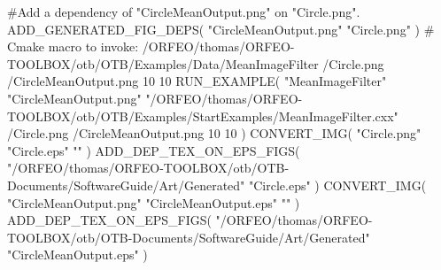 #Add a dependency of "CircleMeanOutput.png" on "Circle.png".
ADD_GENERATED_FIG_DEPS( "CircleMeanOutput.png" "Circle.png" )
# Cmake macro to invoke: /ORFEO/thomas/ORFEO-TOOLBOX/otb/OTB/Examples/Data/MeanImageFilter  /Circle.png /CircleMeanOutput.png 10 10
RUN_EXAMPLE( "MeanImageFilter" "CircleMeanOutput.png" "/ORFEO/thomas/ORFEO-TOOLBOX/otb/OTB/Examples/StartExamples/MeanImageFilter.cxx"  /Circle.png /CircleMeanOutput.png 10 10 )
CONVERT_IMG( "Circle.png" "Circle.eps" "" )
ADD_DEP_TEX_ON_EPS_FIGS( "/ORFEO/thomas/ORFEO-TOOLBOX/otb/OTB-Documents/SoftwareGuide/Art/Generated" "Circle.eps" )
CONVERT_IMG( "CircleMeanOutput.png" "CircleMeanOutput.eps" "" )
ADD_DEP_TEX_ON_EPS_FIGS( "/ORFEO/thomas/ORFEO-TOOLBOX/otb/OTB-Documents/SoftwareGuide/Art/Generated" "CircleMeanOutput.eps" )

